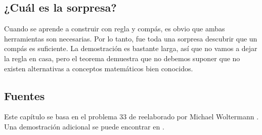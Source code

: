 \subsection*{¿Cuál es la sorpresa?}

Cuando se aprende a construir con regla y compás, es obvio que ambas herramientas son necesarias. Por lo tanto, fue toda una sorpresa descubrir que un compás es suficiente. La demostración es bastante larga, así que no vamos a dejar la regla en casa, pero el teorema demuestra que no debemos suponer que no existen alternativas a conceptos matemáticos bien conocidos.

\subsection*{Fuentes}

Este capítulo se basa en el problema $33$ de \cite{dorrie1} reelaborado por Michael Woltermann \cite{dorrie2}. Una demostración adicional se puede encontrar en \cite{mm}.
